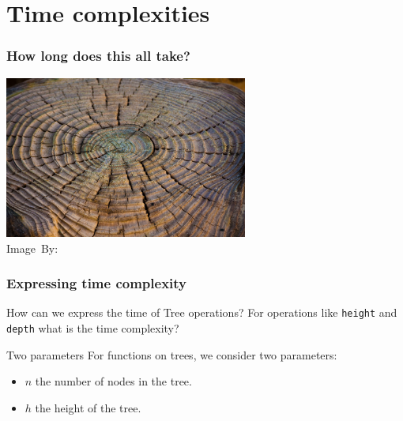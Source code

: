 \section{Time complexities}
\label{sec:time_complexities}

\begin{frame}
	\frametitle{How long does this all take?}
	
	\begin{center}
		\includegraphics[width=0.6\textwidth]{figures/tree_age.jpg}\\
		\hspace*{15pt}\hbox{\scriptsize Image By:}
	\end{center}
\end{frame}

\begin{frame}
	\frametitle{Expressing time complexity}
	\begin{questionblock}{How can we express the time of Tree operations?}
		For operations like \texttt{height} and \texttt{depth} what is the time complexity?
	\end{questionblock}
	\pause
		\begin{block}{Two parameters}
			For functions on trees, we consider two parameters:
			\begin{itemize}
				\item $n$ the number of nodes in the tree.
				\item $h$ the height of the tree.
			\end{itemize}
		\end{block}	
\end{frame}

